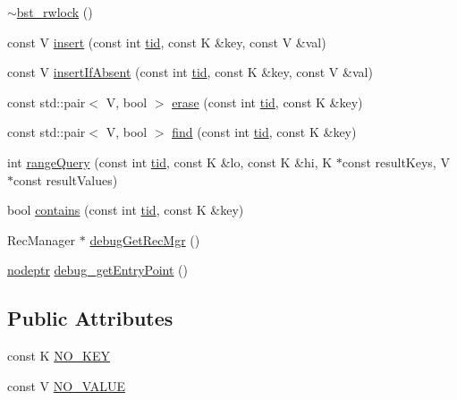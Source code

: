 \begin{DoxyCompactItemize}
\hyperlink{classbst__rwlock__ns_1_1bst__rwlock_aeced6e42f96359b65eeb496563af89a6}{$\sim$bst\+\_\+rwlock} ()
\item 
const V \hyperlink{classbst__rwlock__ns_1_1bst__rwlock_ae6c99b27e1a1d69029308fac2db945e3}{insert} (const int \hyperlink{microbench_2main_8cpp_a9ca9869868fe7e7a38a921cc7de4103f}{tid}, const K \&key, const V \&val)
\item 
const V \hyperlink{classbst__rwlock__ns_1_1bst__rwlock_a1b1924a1c36bf81b71fe7c9ccb89ef9b}{insert\+If\+Absent} (const int \hyperlink{microbench_2main_8cpp_a9ca9869868fe7e7a38a921cc7de4103f}{tid}, const K \&key, const V \&val)
\item 
const std\+::pair$<$ V, bool $>$ \hyperlink{classbst__rwlock__ns_1_1bst__rwlock_a7523642b2b1a2293541a04829258a9e7}{erase} (const int \hyperlink{microbench_2main_8cpp_a9ca9869868fe7e7a38a921cc7de4103f}{tid}, const K \&key)
\item 
const std\+::pair$<$ V, bool $>$ \hyperlink{classbst__rwlock__ns_1_1bst__rwlock_a6cba52fe5ba2d0cb743d690df5d3eb04}{find} (const int \hyperlink{microbench_2main_8cpp_a9ca9869868fe7e7a38a921cc7de4103f}{tid}, const K \&key)
\item 
int \hyperlink{classbst__rwlock__ns_1_1bst__rwlock_a6ae6dae5dfb3dc230566bb5be9b9196b}{range\+Query} (const int \hyperlink{microbench_2main_8cpp_a9ca9869868fe7e7a38a921cc7de4103f}{tid}, const K \&lo, const K \&hi, K $\ast$const result\+Keys, V $\ast$const result\+Values)
\item 
bool \hyperlink{classbst__rwlock__ns_1_1bst__rwlock_ade66bdd27e466ccfcda067ebc139f2e8}{contains} (const int \hyperlink{microbench_2main_8cpp_a9ca9869868fe7e7a38a921cc7de4103f}{tid}, const K \&key)
\item 
Rec\+Manager $\ast$ \hyperlink{classbst__rwlock__ns_1_1bst__rwlock_a824bdfe03d587f211c4454b06b1268ed}{debug\+Get\+Rec\+Mgr} ()
\item 
\hyperlink{bst__rwlock__impl_8h_a04158d2a20768fe447133ff555823b05}{nodeptr} \hyperlink{classbst__rwlock__ns_1_1bst__rwlock_a63f6ecffb9692643fef6cfd07d51bae3}{debug\+\_\+get\+Entry\+Point} ()
\end{DoxyCompactItemize}
\subsection*{Public Attributes}
\begin{DoxyCompactItemize}
\item 
const K \hyperlink{classbst__rwlock__ns_1_1bst__rwlock_aaf0250aff9b47856f94043733aabcf41}{N\+O\+\_\+\+K\+EY}
\item 
const V \hyperlink{classbst__rwlock__ns_1_1bst__rwlock_a64d3ed4583e983e4cfc71fdb18cc233c}{N\+O\+\_\+\+V\+A\+L\+UE}
\end{DoxyCompactItemize}


